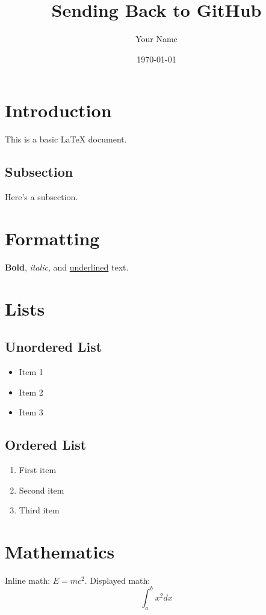 \documentclass{article}
\begin{document}
\title{Sending Back to GitHub}
\author{Your Name}
\date{\today}

\maketitle

\section{Introduction}
This is a basic LaTeX document.

\subsection{Subsection}
Here's a subsection.

\section{Formatting}
\textbf{Bold}, \textit{italic}, and \underline{underlined} text.

\section{Lists}
\subsection{Unordered List}
\begin{itemize}
    \item Item 1
    \item Item 2
    \item Item 3
\end{itemize}

\subsection{Ordered List}
\begin{enumerate}
    \item First item
    \item Second item
    \item Third item
\end{enumerate}

\section{Mathematics}
Inline math: $E=mc^2$. Displayed math:
\[ \int_{a}^{b} x^2 dx \]
\end{document}
